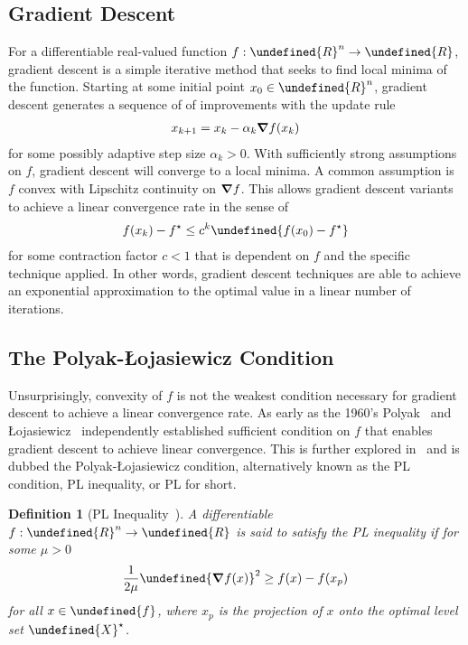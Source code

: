 \documentclass[11pt]{article}  %
\newtheorem{definition}{Definition}
\let\mbb\undefined
\newcommand{\mbb}[1]{\mathbb{#1}}
\let\mcal\undefined
\newcommand{\mcal}[1]{\mathcal{#1}}
\let\brackets\undefined
\newcommand{\brackets}[1]{\left[#1\right]}
\let\norm\undefined
\newcommand{\norm}[1]{\lVert #1 \rVert}
\let\dom\undefined
\DeclareMathOperator{\dom}{dom}
\begin{document}
\subsection{Gradient Descent}
For a differentiable real-valued function \(f : \mbb{R}^n \to \mbb{R}\),
gradient descent is a simple iterative method that
seeks to find local minima of the function.
Starting at some initial point \(x_0 \in \mbb{R}^n\),
gradient descent generates a sequence of of improvements with the update rule
\begin{align}
  x_{k + 1} = x_k - \alpha_k \grad f(x_k)
\end{align}
for some possibly adaptive step size \(\alpha_k > 0\).
With sufficiently strong assumptions on \(f\),
gradient descent will converge to a local minima.
A common assumption is \(f\) convex with Lipschitz continuity on \(\grad f\).
This allows gradient descent variants to achieve a
linear convergence rate in the sense of
\begin{align}
  f(x_k) - f^\star \leq c^k \brackets{f(x_0) - f^\star}
\end{align}
for some contraction factor \(c < 1\) that is dependent on \(f\)
and the specific technique applied.
In other words, gradient descent techniques are able to achieve
an exponential approximation to the optimal value in a
linear number of iterations.

\subsection{The Polyak-\L{}ojasiewicz Condition}
Unsurprisingly, convexity of \(f\) is not the weakest condition necessary
for gradient descent to achieve a linear convergence rate.
As early as the 1960's Polyak~\cite{polyak1963gradient}
and \L{}ojasiewicz~\cite{lojasiewicz1961probleme}
independently established sufficient condition on \(f\) that
enables gradient descent to achieve linear convergence.
This is further explored in~\cite{karimi2016linear}
and is dubbed the Polyak-\L{}ojasiewicz condition,
alternatively known as the PL condition, PL inequality, or PL for short.

\begin{definition}[PL Inequality~\cite{karimi2016linear, polyak1963gradient, lojasiewicz1961probleme}]
  A differentiable \(f : \mbb{R}^n \to \mbb{R}\)
  is said to satisfy the PL inequality
  if for some \(\mu > 0\)
  \begin{align}
    \frac{1}{2 \mu} \norm{\grad f (x)}^2 \geq f(x) - f(x_p)
    \label{eq:pl-ineq}
  \end{align}
  for all \(x \in \dom{f}\),
  where \(x_p\) is the projection of \(x\) onto
  the optimal level set \(\mcal{X}^\star\).
\end{definition}
\end{document}
